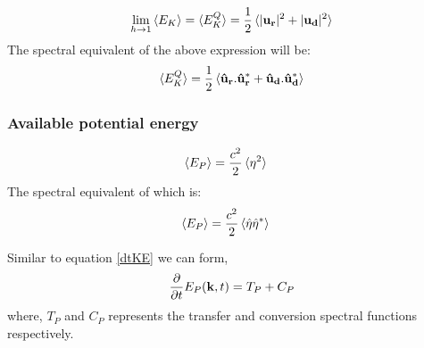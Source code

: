 \begin{equation}
\lim_{h \to 1} \braket{E_K} = \braket{E_K^{Q}}
=  \frac{1}{2}\braket{|\mathbf{u_r}  | ^2 + | \mathbf{u_d} | ^2}
\end{equation}
The spectral equivalent of the above expression will be:
\begin{equation}
\braket{E_K^{Q} }
=  \frac{1}{2}\braket{ \mathbf{\hat{u}_r}.\mathbf{\hat{u}_r}^* + 
\mathbf{\hat{u}_d}.\mathbf{\hat{u}_d}^* }
\end{equation}

\subsubsection{Available potential energy}
\begin{align}
\braket{ E_P} 
& = \frac{c^2}{2} \braket{ \eta^2}
\end{align}
The spectral equivalent of which is:
\begin{align}
\braket{ E_P} 
& = \frac{c^2}{2} \braket{ \hat{\eta}\hat{\eta}^*}
\end{align}

Similar to equation \eqref{dtKE} we can form,
\begin{equation}\label{dtPE}
 \frac{\partial}{\partial t}E_P(\mathbf{k},t) = T_P+ C_P
\end{equation}
where, $T_P$ and $C_P$ represents the transfer and conversion spectral 
functions respectively.

